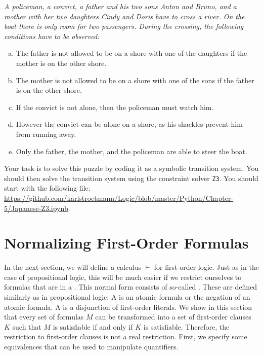 \begin{minipage}{0.95\linewidth}
{\sl
  A policeman, a convict, a father and his two sons Anton and Bruno, and a mother with her two daughters Cindy and Doris have to cross a river. On the boat there is only room for two passengers.
During the crossing, the following conditions have to be observed:
\begin{enumerate}[(a)]
\item The father is not allowed to be on a shore with one of the daughters if the mother is on the other shore.
\item The mother is not allowed to be on a shore with one of the sons if the father is on the other shore.
\item If the convict is not alone, then the policeman must watch him.
\item However the convict can be alone on a shore, as his shackles prevent him from running away.
\item Only the father, the mother, and the policeman are able to steer the boat.
\end{enumerate}}
\end{minipage}
Your task is to solve this puzzle by coding it as a symbolic transition system.  You should then solve the
transition system using the constraint solver \texttt{Z3}.
You should start with the following file:
\\[0.2cm]
\hspace*{0.0cm}
\href{https://github.com/karlstroetmann/Logic/blob/master/Python/Chapter-5/Japanese-Z3.ipynb}{https://github.com/karlstroetmann/Logic/blob/master/Python/Chapter-5/Japanese-Z3.ipynb}.
\eox

\section{Normalizing First-Order Formulas}
In the next section, we will define a calculus $\vdash$ for first-order logic. Just as in the case of
propositional logic, this will be much easier if we restrict ourselves to formulas that are in a . 
This normal form consists of so-called .
These are defined similarly as in propositional logic: A 
is an atomic formula or the negation of an atomic formula. A  
is a disjunction of first-order literals. We show in this section that every set of formulas $M$ can be
transformed into a set of first-order clauses $K$ such that 
$M$ is satisfiable if and only if $K$ is satisfiable. Therefore, the restriction to first-order clauses is
not a real restriction. First, we specify some equivalences that can be used to manipulate quantifiers.

